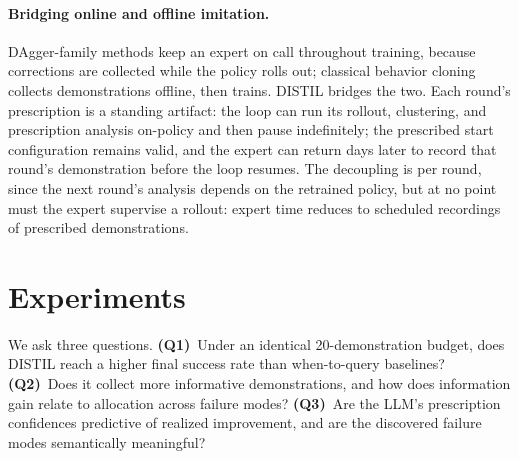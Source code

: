 \documentclass[letterpaper]{article} %
\begin{document}
\paragraph{Bridging online and offline imitation.}
DAgger-family methods keep an expert on call throughout training, because
corrections are collected while the policy rolls out; classical behavior
cloning collects demonstrations offline, then trains. DISTIL bridges the
two.
Each round's prescription is a standing artifact: the loop can run its
rollout, clustering, and prescription analysis on-policy and then pause
indefinitely; the prescribed start configuration remains valid, and the
expert can return days later to record that round's demonstration before
the loop resumes. The decoupling is per round, since the next round's
analysis depends on the retrained policy, but at no point must the expert
supervise a rollout: expert time reduces to scheduled recordings of
prescribed demonstrations.

\section{Experiments}
\label{sec:experiments}

We ask three questions. \textbf{(Q1)}~Under an identical 20-demonstration
budget, does DISTIL reach a higher final success rate than when-to-query
baselines? \textbf{(Q2)}~Does it collect more informative demonstrations,
and how does information gain relate to allocation across failure modes?
\textbf{(Q3)}~Are the LLM's prescription confidences predictive of realized
improvement, and are the discovered failure modes semantically meaningful?
\end{document}
